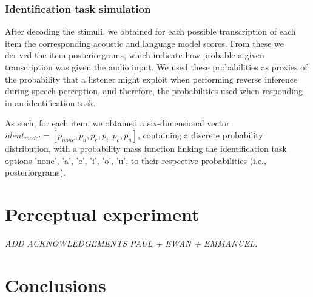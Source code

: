 \subsubsection{Identification task simulation}
After decoding the stimuli, we obtained for each possible transcription of each item the corresponding acoustic and language model scores. From these we derived the item posteriorgrams, which indicate how probable a given transcription was given the audio input. We used these probabilities as proxies of the probability that a listener might exploit when performing reverse inference during speech perception, and therefore, the probabilities used when responding in an identification task. 

As such, for each item, we obtained a six-dimensional vector $ident_{model} = [p_{none}, p_{a}, p_{e}, p_{i}, p_{o}, p_{u}]$, containing a discrete probability distribution, with a probability mass function linking the identification task options 'none', 'a', 'e', 'i', 'o', 'u', to their respective probabilities (i.e., posteriorgrams).


\section{Perceptual experiment}
\small{\textit{{\color{red}ADD ACKNOWLEDGEMENTS PAUL + EWAN + EMMANUEL.\\}}}

\section{Conclusions}



